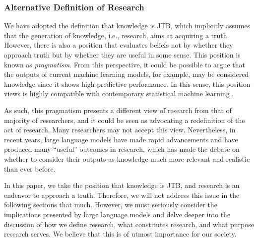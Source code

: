 \documentclass{book}
\begin{document}




\subsubsection{Alternative Definition of Research}
We have adopted the definition that knowledge is JTB, which implicitly assumes that the generation of knowledge, i.e., research, aims at acquiring a truth. However, there is also a position that evaluates beliefs not by whether they approach truth but by whether they are useful in some sense. This position is known as \textit{pragmatism}. From this perspective, it could be possible to argue that the outputs of current machine learning models, for example, may be considered knowledge since it shows high predictive performance. In this sense, this position views is highly compatible with contemporary statistical machine learning \cite{otsuka2022thinking}.

As such, this pragmatism presents a different view of research from that of majority of researchers, and it could be seen as advocating a redefinition of the act of research. Many researchers may not accept this view. Nevertheless, in recent years, large language models have made rapid advancements and have produced many ``useful'' outcomes in research, which has made the debate on whether to consider their outputs as knowledge much more relevant and realistic than ever before.

In this paper, we take the position that knowledge is JTB, and research is an endeavor to approach a truth. Therefore, we will not address this issue in the following sections that much. However, we must seriously consider the implications presented by large language models and delve deeper into the discussion of how we define research, what constitutes research, and what purpose research serves. We believe that this is of utmost importance for our society.
\end{document}
